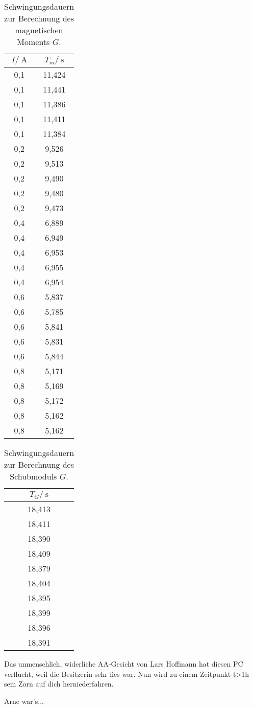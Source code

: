 \begin{table}
	\centering
	\begin{tabular}{cc}
	\toprule
	{$I/\:\si{\ampere}$} & {$T_m/\:\si{\second}$}\\
	\midrule
0,1 & 11,424 \\
0,1 & 11,441 \\
0,1 & 11,386 \\
0,1 & 11,411 \\
0,1 & 11,384 \\
0,2 &  9,526 \\
0,2 &  9,513 \\
0,2 &  9,490 \\
0,2 &  9,480 \\
0,2 &  9,473 \\
0,4 &  6,889 \\
0,4 &  6,949 \\
0,4 &  6,953 \\
0,4 &  6,955 \\
0,4 &  6,954 \\
0,6 &  5,837 \\
0,6 &  5,785 \\
0,6 &  5,841 \\
0,6 &  5,831 \\
0,6 &  5,844 \\
0,8 &  5,171 \\
0,8 &  5,169 \\
0,8 &  5,172 \\
0,8 &  5,162 \\
0,8 &  5,162 \\
	\bottomrule
	\end{tabular}
	\caption{Schwingungsdauern zur Berechnung des magnetischen Moments $G$.}
	\label{tab:T_m}
\end{table}

\begin{table}
	\centering
	\begin{tabular}{c}
	\toprule
	{$T_G/\:\si{\second}$}\\
	\midrule
18,413\\
18,411\\
18,390\\
18,409\\
18,379\\
18,404\\
18,395\\
18,399\\
18,396\\
18,391\\
	\bottomrule
	\end{tabular}
	\caption{Schwingungsdauern zur Berechnung des Schubmoduls $G$.}
	\label{tab:T_G}
\end{table}
Das unmenschlich, widerliche AA-Gesicht von Lars Hoffmann hat diesen PC verflucht, weil die Besitzerin sehr fies war. Nun wird zu einem Zeitpunkt t>1h sein Zorn auf dich herniederfahren.


Arne war's...
